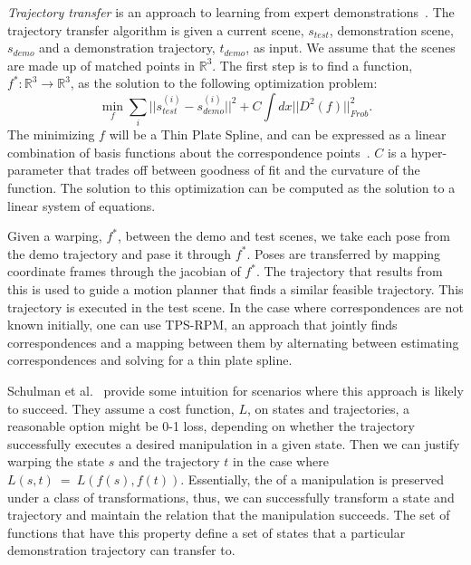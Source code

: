 \emph{Trajectory transfer} is an approach to learning from expert demonstrations~\cite{Schulmanetal_ISRR2013}. The trajectory transfer
algorithm is given a current scene, $s_{test}$, demonstration scene, $s_{demo}$ and a demonstration trajectory,  
$t_{demo}$, as input. We assume that the scenes are made up of matched points in $\mathbb{R}^3$. The first step is to 
find a function, $f^*:\mathbb{R}^3 \rightarrow \mathbb{R}^3$, as the solution to the following optimization problem:
\begin{equation}\min_f \sum_i ||s_{test}^{(i)} - s_{demo}^{(i)}||^2 + C\int dx ||D^2(f)||^2_{Frob}.\label{eq:tps}\end{equation}
The minimizing $f$ will be a Thin Plate Spline, and can be expressed as a linear combination of basis
functions about the correspondence points~\cite{Wahba_TPS1990}. $C$ is a hyper-parameter that trades off
between goodness of fit and the curvature of the function. The solution to this optimization can be computed
as the solution to a linear system of equations.

Given a warping, $f^*$, between the demo and test scenes, we take each pose from the demo trajectory and pase it through
$f^*$. Poses are transferred by mapping coordinate frames through the jacobian of $f^*$. The trajectory that results from this
is used to guide a motion planner that finds a similar feasible trajectory. This trajectory is executed in the test scene.
In the case where correspondences are not known initially, one can use TPS-RPM, an approach that jointly finds
correspondences and a mapping between them by alternating between estimating correspondences and solving for 
a thin plate spline\cite{Chui_CVIU2003}.

Schulman et al.~\cite{Schulmanetal_ISRR2013} provide some intuition for scenarios where this approach is likely
to succeed. They assume a cost function, $L$, on states and trajectories, a reasonable option might be 0-1 loss, depending
on whether the trajectory successfully executes a desired manipulation in a given state.  Then we can justify warping the
state $s$ and the trajectory $t$ 
in the case where $L(s, t)~=~L(f(s), f(t))$. Essentially, the of a manipulation is preserved under a class of transformations,
thus, we can successfully transform a state and trajectory and maintain the relation that the manipulation succeeds. The set of functions
that have this property define a set of states that a particular demonstration trajectory can transfer to.

